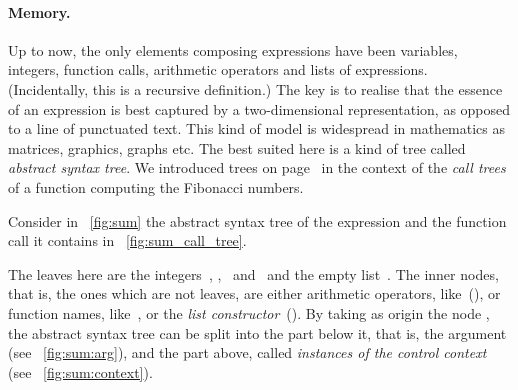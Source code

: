\bigskip

\paragraph{Memory.}

Up to now, the only elements composing expressions have been
variables, integers, function calls, arithmetic operators and lists of
expressions. (Incidentally, this is a recursive definition.) The key
is to realise that the essence of an expression is best captured by a
two\hyp{}dimensional representation, as opposed to a line of
punctuated text. This kind of model is widespread in mathematics as
matrices, graphics, graphs etc. The best suited here is a kind of tree
called \emph{abstract syntax tree}. We introduced trees on
page~\pageref{def:tree} in the context of the \emph{call trees} of a
function computing the Fibonacci numbers.

Consider in \fig~\vref{fig:sum} the abstract syntax tree of the
expression  and the function call it
contains in \fig~\vref{fig:sum_call_tree}.
\begin{figure}[!b]
\centering
{}
\qquad
{}
\quad
{}
\qquad
{}
\caption{}
\end{figure}
The leaves here are the integers~, ,
~and~ and the empty list~\erlcode{[]}. The inner
nodes, that is, the ones which are not leaves, are either arithmetic
operators, like~(\erlcode{+}), or function names, like~,
or the \emph{list constructor}~(\erlcode{|}). By taking as origin the
node , the abstract syntax tree can be split into the
part below it, that is, the argument (see \fig~\vref{fig:sum:arg}),
and the part above, called \emph{instances of the control context}
(see \fig~\vref{fig:sum:context}).

